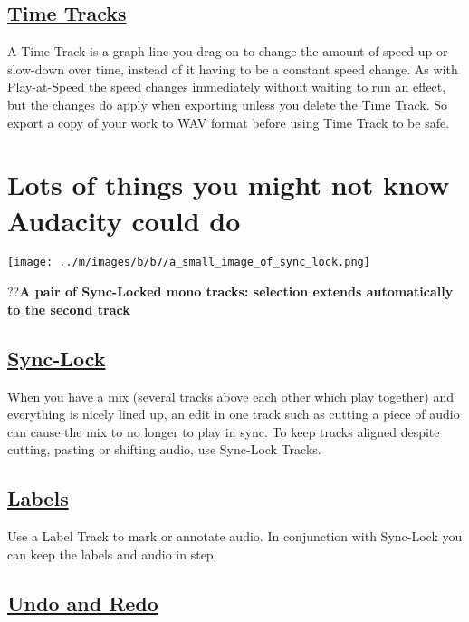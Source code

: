 \documentclass[]{book}
\begin{document}
\begin{multicols}{2}
\subsection{
\hyperref[time_tracks_]{Time Tracks}
}


A Time Track is a graph line you drag on to change the amount of speed-up or slow-down over time, instead of it having to be a constant speed change. As with Play-at-Speed the speed changes immediately without waiting to run an effect, but the changes do apply when exporting unless you delete the Time Track. So export a copy of your work to WAV format before using Time Track to be safe. 



\section{Lots of things you might not know Audacity could do}

\par\texttt{[image: ../m/images/b/b7/a\_small\_image\_of\_sync\_lock.png]}\par??\textbf{A pair of Sync-Locked mono tracks: selection extends automatically to the second track}

\subsection{
\hyperref[sync_locked_track_groups_]{Sync-Lock}
}


When you have a mix (several tracks above each other which play together) and everything is nicely lined up, an edit in one track such as cutting a piece of audio can cause the mix to no longer to play in sync. To keep tracks aligned despite cutting, pasting or shifting audio, use Sync-Lock Tracks.

\subsection{
\hyperref[label_tracks_]{Labels}
}


Use a Label Track to mark or annotate audio.  In conjunction with Sync-Lock you can keep the labels and audio in step.

\subsection{
\hyperref[undo_redo_and_history_]{Undo and Redo}
}



\end{multicols}
\end{document}
